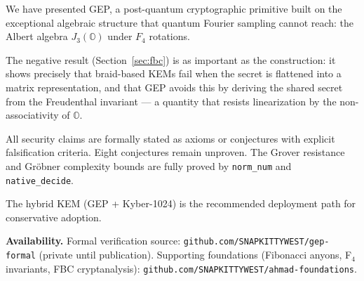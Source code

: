\documentclass[11pt,letterpaper]{article}
\theoremstyle{definition}
\begin{document}
We have presented GEP, a post-quantum cryptographic primitive built on the
exceptional algebraic structure that quantum Fourier sampling cannot reach:
the Albert algebra $J_3(\mathbb{O})$ under $F_4$ rotations.

The negative result (Section~\ref{sec:fbc}) is as important as the construction:
it shows precisely that braid-based KEMs fail when the secret is flattened into a
matrix representation, and that GEP avoids this by deriving the shared secret from
the Freudenthal invariant — a quantity that resists linearization by the
non-associativity of $\mathbb{O}$.

All security claims are formally stated as axioms or conjectures with explicit
falsification criteria.  Eight conjectures remain unproven.  The Grover resistance
and Gr\"obner complexity bounds are fully proved by \texttt{norm\_num} and
\texttt{native\_decide}.

The hybrid KEM (GEP + Kyber-1024) is the recommended deployment path for
conservative adoption.

\bigskip
\noindent\textbf{Availability.}
Formal verification source: \texttt{github.com/SNAPKITTYWEST/gep-formal} (private
until publication).  Supporting foundations (Fibonacci anyons, F$_4$ invariants,
FBC cryptanalysis): \texttt{github.com/SNAPKITTYWEST/ahmad-foundations}.
\end{document}
